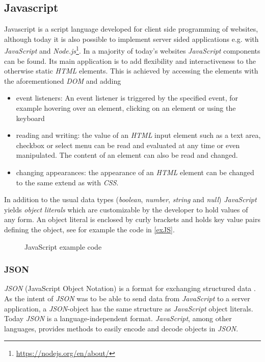 \subsection{Javascript}
Javascript \cite{Ackermann2015, mdn-web-dokumentation,wiki-js} is a script language developed for client side programming of websites, although today it is also possible to implement server sided applications e.g. with \textit{JavaScript} and \textit{Node.js}\footnote{\url{https://nodejs.org/en/about/}}. In a majority of today's websites \textit{JavaScript} components can be found. Its main application is to add flexibility and interactiveness to the otherwise static \textit{HTML} elements. This is achieved by accessing the elements with the aforementioned \textit{DOM} and adding 
\begin{itemize}
\item event listeners: An event listener is triggered by the specified event, for example hovering over an element, clicking on an element or using the keyboard
\item reading and writing: the value of an \textit{HTML} input element such as a text area, checkbox or select menu can be read and evaluated at any time or even manipulated. The content of an element can also be read and changed.
\item changing appearances: the appearance of an \textit{HTML} element can be changed to the same extend as with \textit{CSS}.
\end{itemize}
In addition to the usual data types (\textit{boolean}, \textit{number}, \textit{string} and \textit{null}) \textit{JavaScript} yields \textit{object literals} which are customizable by the developer to hold values of any form. An object literal is enclosed by curly brackets and holds key value pairs defining the object, see for example the code in \autoref{exJS}.

\begin{figure}[!h]

\caption{JavaScript example code}
\label{exJS}
\end{figure}

\subsubsection{JSON} 
\textit{JSON} (JavaScript Object Notation) is a format for exchanging structured data \cite{wiki:json}. As the intent of \textit{JSON} was to be able to send data from \textit{JavaScript} to a server application, a \textit{JSON}-object has the same structure as \textit{JavaScript} object literals. Today \textit{JSON} is a language-independent format. \textit{JavaScript}, among other languages, provides methods to easily encode and decode objects in \textit{JSON}.
